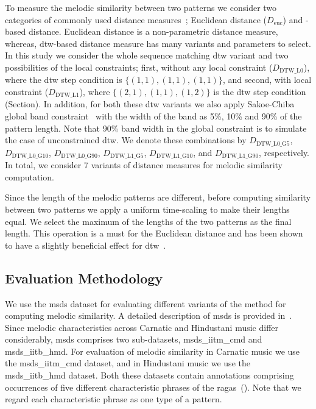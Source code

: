 To measure the melodic similarity between two patterns we consider two categories of commonly used distance measures~\cite{Ross2012b, Rao2014, muller2007information}; Euclidean distance ($D_{\mathrm{euc}}$) and -based distance. Euclidean distance is a non-parametric distance measure, whereas, \gls{dtw}-based distance measure has many variants and parameters to select. In this study we consider the whole sequence matching \gls{dtw} variant and two possibilities of the local constraints; first, without any local constraint ($D_{\mathrm{DTW\_L0}}$), where the \gls{dtw} step condition is $\lbrace(1,1), (1,1), (1,1)\rbrace$, and second, with local constraint ($D_{\mathrm{DTW\_L1}}$), where $\lbrace(2,1), (1,1), (1,2)\rbrace$ is the \gls{dtw} step condition (Section). In addition, for both these \gls{dtw} variants we also apply Sakoe-Chiba global band constraint~\cite{Sakoe78TASLP} with the width of the band as 5\%, 10\% and 90\% of the pattern length. Note that 90\% band width in the global constraint is to simulate the case of unconstrained \gls{dtw}. We denote these combinations by $D_{\mathrm{DTW\_L0\_G5}}$, $D_{\mathrm{DTW\_L0\_G10}}$, $D_{\mathrm{DTW\_L0\_G90}}$, $D_{\mathrm{DTW\_L1\_G5}}$, $D_{\mathrm{DTW\_L1\_G10}}$, and $D_{\mathrm{DTW\_L1\_G90}}$, respectively. In total, we consider 7 variants of distance measures for melodic similarity computation.

Since the length of the melodic patterns are different, before computing similarity between two patterns we apply  a uniform time-scaling to make their lengths equal. We select the maximum of the lengths of the two patterns as the final length. This operation is a must for the Euclidean distance and has been shown to have a slightly beneficial effect for \gls{dtw}~\citep{Ratanamahatana2004}.


\subsection{Evaluation Methodology}

We use the \acrshort{msds} dataset for evaluating different variants of the method for computing melodic similarity. A detailed description of \acrshort{msds} is provided in~. Since melodic characteristics across Carnatic and Hindustani music differ considerably, \acrshort{msds} comprises two sub-datasets, \acrshort{msds_iitm_cmd} and \acrshort{msds_iitb_hmd}. For evaluation of melodic similarity in Carnatic music we use the \acrshort{msds_iitm_cmd} dataset, and in Hindustani music we use the \acrshort{msds_iitb_hmd} dataset. Both these datasets contain annotations comprising occurrences of five different characteristic phrases of the \glspl{raga}~(). Note that we regard each characteristic phrase as one type of a pattern.

